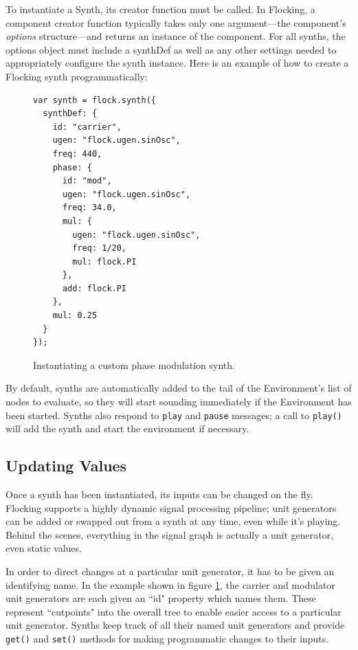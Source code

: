\documentclass{article}
\begin{document}
To instantiate a Synth, its creator function must be called. In Flocking, a component creator function typically takes only one argument---the component's {\it options} structure---and returns an instance of the component. For all synths, the options object must include a synthDef as well as any other settings needed to appropriately configure the synth instance. Here is an example of how to create a Flocking synth programmatically:

\begin{figure}[h!]
    \begin{verbatim}
var synth = flock.synth({
  synthDef: {
    id: "carrier",
    ugen: "flock.ugen.sinOsc",
    freq: 440,
    phase: {
      id: "mod",
      ugen: "flock.ugen.sinOsc",
      freq: 34.0,
      mul: {
        ugen: "flock.ugen.sinOsc",
        freq: 1/20,
        mul: flock.PI
      },
      add: flock.PI
    },
    mul: 0.25
  }
});
    \end{verbatim}
    \caption{Instantiating a custom phase modulation synth.\label{fig:pmSynth}}
\end{figure}

By default, synths are automatically added to the tail of the Environment's list of nodes to evaluate, so they will start sounding immediately if the Environment has been started. Synths also respond to \verb|play| and \verb|pause| messages; a call to \verb|play()| will add the synth and start the environment if necessary.

\subsection{Updating Values}

Once a synth has been instantiated, its inputs can be changed on the fly. Flocking supports a highly dynamic signal processing pipeline; unit generators can be added or swapped out from a synth at any time, even while it's playing. Behind the scenes, everything in the signal graph is actually a unit generator, even static values.

In order to direct changes at a particular unit generator, it has to be given an identifying name. In the example shown in figure \ref{fig:pmSynth}, the carrier and modulator unit generators are each given an ``id" property which names them. These represent ``cutpoints" into the overall tree to enable easier access to a particular unit generator. Synths keep track of all their named unit generators and provide \verb|get()| and \verb|set()| methods for making programmatic changes to their inputs.
\end{document}
